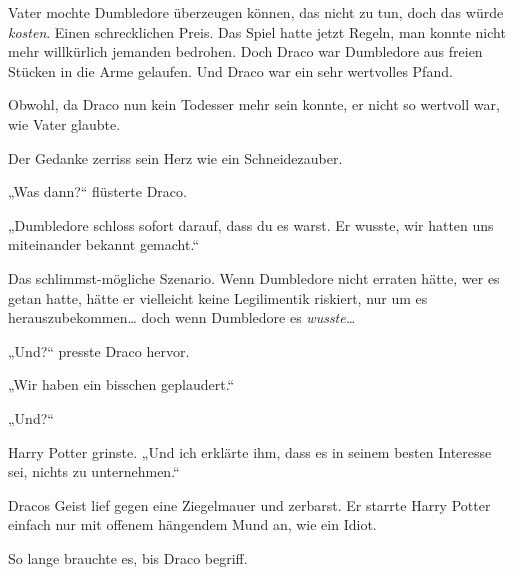 Vater mochte Dumbledore überzeugen können, das nicht zu tun, doch das würde \emph{kosten}. Einen schrecklichen Preis. Das Spiel hatte jetzt Regeln, man konnte nicht mehr willkürlich jemanden bedrohen. Doch Draco war Dumbledore aus freien Stücken in die Arme gelaufen. Und Draco war ein sehr wertvolles Pfand.

Obwohl, da Draco nun kein Todesser mehr sein konnte, er nicht so wertvoll war, wie Vater glaubte.

Der Gedanke zerriss sein Herz wie ein Schneidezauber.

„Was dann?“ flüsterte Draco.

„Dumbledore schloss sofort darauf, dass du es warst. Er wusste, wir hatten uns miteinander bekannt gemacht.“

Das schlimmst-mögliche Szenario. Wenn Dumbledore nicht erraten hätte, wer es getan hatte, hätte er vielleicht keine Legilimentik riskiert, nur um es herauszubekommen… doch wenn Dumbledore es \emph{wusste…}

„Und?“ presste Draco hervor.

„Wir haben ein bisschen geplaudert.“

„Und?“

Harry Potter grinste. „Und ich erklärte ihm, dass es in seinem besten Interesse sei, nichts zu unternehmen.“

Dracos Geist lief gegen eine Ziegelmauer und zerbarst. Er starrte Harry Potter einfach nur mit offenem hängendem Mund an, wie ein Idiot.

So lange brauchte es, bis Draco begriff.

